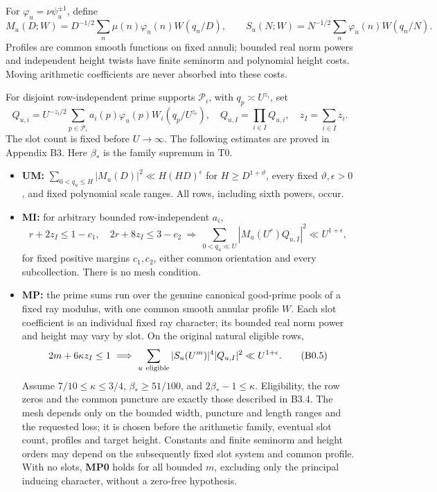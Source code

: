 \documentclass[11pt,a4paper]{article}
\providecommand{\tightlist}{\setlength{\itemsep}{0pt}\setlength{\parskip}{0pt}}
\begin{document}
For \(\varphi_u=\nu\psi_u^{\pm1}\), define \[
M_u(D;W)=D^{-1/2}\sum_n\mu(n)\varphi_u(n)W(q_n/D),\qquad
S_u(N;W)=N^{-1/2}\sum_n\varphi_u(n)W(q_n/N).
\tag{B0.3}
\] Profiles are common smooth functions on fixed annuli; bounded real
norm powers and independent height twists have finite seminorm and
polynomial height costs. Moving arithmetic coefficients are never
absorbed into these costs.

For disjoint row-independent prime supports \(\mathcal P_i\), with
\(q_p\asymp U^{z_i}\), set \[
Q_{u,i}=U^{-z_i/2}\sum_{p\in\mathcal P_i}a_i(p)\varphi_u(p)W_i(q_p/U^{z_i}),
\quad Q_{u,I}=\prod_{i\in I}Q_{u,i},\quad z_I=\sum_{i\in I}z_i.
\] The slot count is fixed before \(U\to\infty\). The following
estimates are proved in Appendix B3. Here \(\beta_*\) is the family
supremum in T0.

\begin{itemize}
\tightlist
\item
  \textbf{UM:} \(\sum_{0<q_u\le H}|M_u(D)|^2\ll H(HD)^\epsilon\) for
  \(H\ge D^{1+\vartheta}\), every fixed \(\vartheta,\allowbreak{}\epsilon>0\), and
  fixed polynomial scale ranges. All rows, including sixth powers,
  occur.
\item
  \textbf{MI:} for arbitrary bounded row-independent \(a_i\), \[
  r+2z_I\le1-c_1,\quad2r+8z_I\le3-c_2
  \ \Longrightarrow\ 
  \sum_{0<q_u\ll U}|M_u(U^r)Q_{u,I}|^2\ll U^{1+\epsilon},
  \tag{B0.4}
  \] for fixed positive margins \(c_1,\allowbreak{}c_2\), either common orientation
  and every subcollection. There is no mesh condition.
\item
  \textbf{MP:} the prime sums run over the genuine canonical good-prime
  pools of a fixed ray modulus, with one common smooth annular profile
  \(W\). Each slot coefficient is an individual fixed ray character; its
  bounded real norm power and height may vary by slot. On the original
  natural eligible rows, \[
  2m+6\kappa z_I\le1\ \Longrightarrow\
  \sum_{u\ {\rm eligible}}|S_u(U^m)|^4|Q_{u,I}|^2\ll U^{1+\epsilon}.
  \tag{B0.5}
  \] Assume \(7/10\le\kappa\le3/4\), \(\beta_*\ge51/100\), and
  \(2\beta_*-1\le\kappa\). Eligibility, the row zeros and the common
  puncture are exactly those described in B3.4. The mesh depends only on
  the bounded width, puncture and length ranges and the requested loss;
  it is chosen before the arithmetic family, eventual slot count,
  profiles and target height. Constants and finite seminorm and height
  orders may depend on the subsequently fixed slot system and common
  profile. With no slots, \textbf{MP0} holds for all bounded \(m\),
  excluding only the principal inducing character, without a zero-free
  hypothesis.
\end{itemize}
\end{document}
